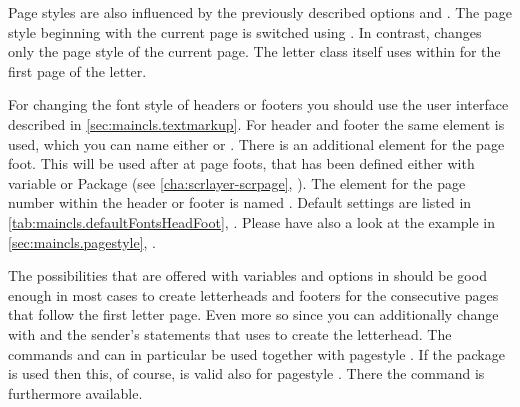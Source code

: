 Page styles are also influenced by the previously described
options
 and
. The page style beginning with
the current page is switched using . In contrast,
 changes only the page style of the current
page. The letter class itself uses
 within
 for the first page of the letter.

\BeginIndexGroup
{}%
%
%
%
For changing the font style of headers or footers you should use the user
interface described in \autoref{sec:maincls.textmarkup}.  For header and
footer the same element is used, which you can name either
 or
.  There is an
additional element 
for the page foot. This will be used after  at page
foots, that has been defined either with variable
 or Package
 (see
\autoref{cha:scrlayer-scrpage},
). The element for the
page number within the header or footer is named
. Default settings
are listed in \autoref{tab:maincls.defaultFontsHeadFoot},
.  Please have also a look at
the example in \autoref{sec:maincls.pagestyle},
.
%
\EndIndexGroup
%
\EndIndexGroup


\begin{Declaration}
\end{Declaration}
The possibilities that are offered with variables and options in
 should be good enough in most cases to create letterheads and
footers for the consecutive pages that follow the first letter page. Even more
so since you can additionally change with  and
 the sender's statements that  uses to create
the letterhead. The commands  and
 can in particular be used together with
pagestyle %
. If the package
 is used then this,
of course, is valid also for pagestyle
. There the command
 is furthermore
available.

